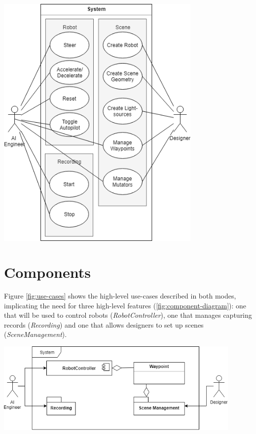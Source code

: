 \begin{center}
\noindent\includegraphics[width=10cm]{tex/img/ch04/UseCases_Fine_01.png}
\label{fig:use-cases}
\end{center}

\section{Components}
Figure \ref{fig:use-cases} shows the high-level use-cases described in both modes, implicating the need for three high-level features (\ref{fig:component-diagram}): one that will be used to control robots (\textit{RobotController}), one that manages capturing records (\textit{Recording}) and one that allows designers to set up scenes (\textit{SceneManagement}).

\begin{center}
\noindent\includegraphics[width=12cm]{tex/img/ch04/ComponentDiagram01.png}
\label{fig:component-diagram}
\end{center}

